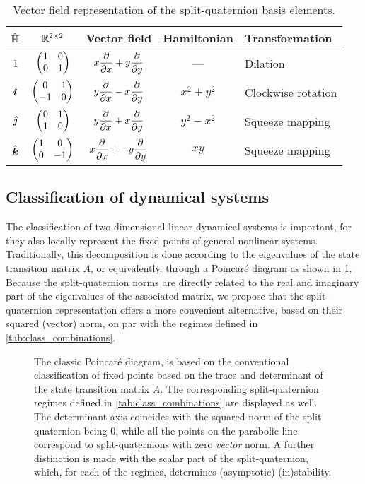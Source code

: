 \begin{table}[ht!]
    \centering
    \caption{Vector field representation of the split-quaternion basis elements.}
    \label{tab:basis_vf}
    \begin{tabular}{ccccl}
        \toprule
        $\spquaternions$ &  $ \real^{2\times 2} $ & \textbf{Vector field} & \textbf{Hamiltonian} & \textbf{Transformation} \\
        \midrule
        $1$ & $\mqty(1 & 0 \\ 0 & 1) $ & $\displaystyle x\pdv{}{x} + y\pdv{}{y} $ & --- & Dilation \\[0.4cm]

        $\quati$ & $\mqty(0 & 1 \\ -1 & 0) $ & $\displaystyle y\pdv{}{x} - x\pdv{}{y} $ & $ x^2 + y^2 $ & Clockwise rotation \\[0.4cm]

        $\quatj$ & $\mqty(0 & 1 \\ 1 & 0) $ & $\displaystyle y\pdv{}{x} + x\pdv{}{y} $ & $ y^2 - x^2 $ & Squeeze mapping \\[0.4cm]

        $\quatk$ & $\mqty(1 & 0 \\ 0 & -1) $ & $\displaystyle x\pdv{}{x} + -y\pdv{}{y} $ & $ xy $ & Squeeze mapping \\[0.4cm]

        \bottomrule
    \end{tabular}
\end{table}

\subsection{Classification of dynamical systems}
\label{ssec:system_classification}
The classification of two-dimensional linear dynamical systems is important, for they also locally represent the fixed points of general nonlinear systems. Traditionally, this decomposition is done according to the eigenvalues of the state transition matrix \(A\), or equivalently, through a Poincaré diagram as shown in \cref{fig:poincare_diagram}. Because the split-quaternion norms are directly related to the real and imaginary part of the eigenvalues of the associated matrix, we propose that the split-quaternion representation offers a more convenient alternative, based on their squared (vector) norm, on par with the regimes defined in \cref{tab:class_combinations}.
\begin{figure}[ht!]
    \centering
    
    \caption{The classic Poincaré diagram, is based on the conventional classification of fixed points based on the trace and determinant of the state transition matrix \(A\). The corresponding split-quaternion regimes defined in \cref{tab:class_combinations} are displayed as well. The determinant axis coincides with the squared norm of the split quaternion being 0, while all the points on the parabolic line correspond to split-quaternions with zero \emph{vector} norm. A further distinction is made with the scalar part of the split-quaternion, which, for each of the regimes, determines (asymptotic) (in)stability.}
    \label{fig:poincare_diagram}
\end{figure}

